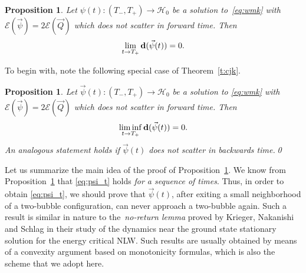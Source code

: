 \documentclass[10pt,reqno]{amsart}
\newcommand{\E}{\mathcal{E}}
\newcommand{\HH}{\mathcal{H}}
\newcommand{\la}{\lambda}
\newcommand{\EQ}[1]{\begin{equation}\begin{split} #1 \end{split}\end{equation}}
\numberwithin{equation}{section}
\newtheorem{prop}[thm]{Proposition}
\theoremstyle{remark}
\newcommand{\0}{\emptyset}
\newcommand{\bfd}{{\bf d}}
\begin{document}


\begin{prop}\label{p:psi_t} 
Let $\psi(t) :(T_-, T_+) \to \HH_0$ be a solution to~\eqref{eq:wmk} with $\E(\vec \psi) = 2 \E(\vec Q)$ which does not scatter in forward time. Then
\EQ{ 
\lim_{t \to T_+} \bfd(\vec \psi(t)) = 0.\label{eq:psi_t}
}
\end{prop}
To begin with, note the following special case of Theorem~\ref{t:cjk}.
\begin{prop}\label{p:cjk}
Let $\vec \psi(t) : (T_-, T_+) \to \HH_0$ be a solution to \eqref{eq:wmk} with $\E(\vec\psi) = 2 \E( \vec Q)$
which does not scatter in forward time. Then
\EQ{ \label{eq:seqbub} 
\liminf_{t\to T_+} \bfd(\vec \psi(t)) = 0.
}
An analogous statement holds if $\vec \psi(t)$ does not scatter in backwards time.\qed
\end{prop}

Let us summarize the main idea of the proof of Proposition~\ref{p:psi_t}. We know from Proposition~\ref{p:cjk} that
\eqref{eq:psi_t} holds \emph{for a sequence of times}.
Thus, in order to obtain \eqref{eq:psi_t}, we should prove that $\vec\psi(t)$, after exiting a small neighborhood of a two-bubble configuration,
can never approach a two-bubble again. Such a result is similar in nature to the~\emph{no-return lemma} proved by Krieger, Nakanishi and Schlag \cite{KNS15} in their study of the dynamics near the ground state stationary solution for the energy critical NLW. 
Such results are usually obtained by means of a convexity argument based on monotonicity formulas, which is also the scheme that we adopt here.
\end{document}
